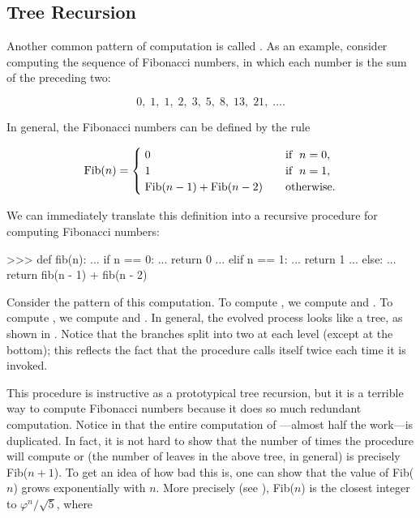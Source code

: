 \subsection{Tree Recursion}
\label{Section 1.2.2}

Another common pattern of computation is called .  As
an example, consider computing the sequence of Fibonacci numbers, in which each
number is the sum of the preceding two:

$$ 0,\; 1,\; 1,\; 2,\; 3,\; 5,\; 8,\; 13,\; 21,\; \dots. $$

\noindent
In general, the Fibonacci numbers can be defined by the rule

$$ {\rm Fib}(n) =
\begin{cases}
        \; 0 & {\rm if} \;\; n=0, \\
	\; 1 & {\rm if} \;\; n=1, \\
	\; {\rm Fib}(n-1) + {\rm Fib}(n-2) \quad & {\rm otherwise}.
\end{cases} $$

\noindent
We can immediately translate this definition into a recursive procedure for
computing Fibonacci numbers:

\begin{codeBlock}
>>> def fib(n):
...     if n == 0:
...         return 0
...     elif n == 1:
...         return 1
...     else:
...         return fib(n - 1) + fib(n - 2)
\end{codeBlock}

\noindent
Consider the pattern of this computation.  To compute , we
compute  and .  To compute , we
compute  and .  In general, the evolved process
looks like a tree, as shown in .  Notice that the branches
split into two at each level (except at the bottom); this reflects the fact
that the  procedure calls itself twice each time it is invoked.

This procedure is instructive as a prototypical tree recursion, but it is a
terrible way to compute Fibonacci numbers because it does so much redundant
computation.  Notice in  that the entire computation of
---almost half the work---is duplicated.  In fact, it is not hard
to show that the number of times the procedure will compute  or
 (the number of leaves in the above tree, in general) is
precisely Fib(\( n+1 \)).  To get an idea of how bad this is, one can
show that the value of Fib(\( n \)) grows exponentially with \( n \).  More
precisely (see ), Fib(\( n \)) is the closest integer
to \( \varphi^n / \sqrt{5} \), where

